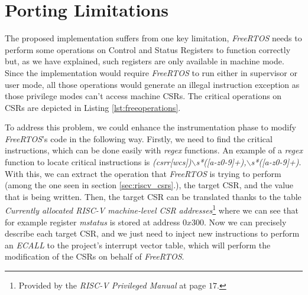 \section{Porting Limitations}
\label{sec:rtos_limitations}

The proposed implementation suffers from one key limitation, \textit{FreeRTOS} needs
to perform some operations on Control and Status Registers to function correctly
but, as we have explained, such registers are only available in machine mode.
Since the implementation would require \textit{FreeRTOS} to run either in supervisor
or user mode, all those operations would generate an illegal instruction
exception as those privilege modes can't access machine CSRs. The critical operations
on CSRs are depicted in Listing \ref{lst:freeoperations}.

To address this problem, we could enhance the instrumentation phase to modify
\textit{FreeRTOS}'s code in the following way. Firstly, we need to find the critical
instructions, which can be done easily with \textit{regex} functions. An example
of a \textit{regex} function to locate critical instructions is \textit{(csrr[wcs])$\backslash$s*([a-z0-9]+),$\backslash$s*([a-z0-9]+)}.
With this, we can extract the operation that \textit{FreeRTOS} is trying to perform
(among the one seen in section \ref{sec:riscv_csrs}.), the target CSR, and the
value that is being written. Then, the target CSR can be translated thanks to
the table \textit{Currently allocated RISC-V machine-level CSR addresses}\footnote{Provided
by the \textit{RISC-V Privileged Manual}\cite{riscv} at page $17$.} where we can
see that for example register \textit{mstatus} is stored at address $0x300$. Now
we can precisely describe each target CSR, and we just need to inject new instructions
to perform an \textit{ECALL} to the project's interrupt vector table, which will
perform the modification of the CSRs on behalf of \textit{FreeRTOS}.

